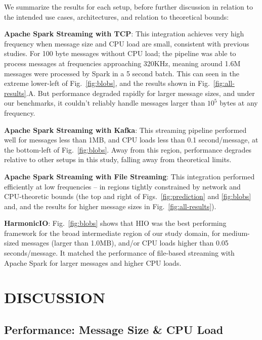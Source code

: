 \documentclass[conference]{IEEEtran}
\begin{document}
We summarize the results for each setup, before further discussion in relation to the intended use cases, architectures, and relation to theoretical bounds:%

\textbf{Apache Spark Streaming with TCP}: 
This integration achieves very high frequency when message size and CPU load are small, consistent with previous studies. For 100 byte messages without CPU load; the pipeline was able to process messages at frequencies approaching 320KHz, meaning around 1.6M messages were processed by Spark in a 5 second batch. This can seen in the extreme lower-left of Fig.~\ref{fig:blobs}, and the results shown in Fig.~\ref{fig:all-results}.A. 
But performance degraded rapidly for larger message sizes, and under our benchmarks, it couldn't reliably handle messages larger than $10^5$ bytes at any frequency.

\textbf{Apache Spark Streaming with Kafka}:
This streaming pipeline performed well for messages less than 1MB, and CPU loads  less than 0.1 second/message, at the bottom-left of Fig.~\ref{fig:blobs}. Away from this region, performance degrades relative to other setups in this study, falling away from theoretical limits.

\textbf{Apache Spark Streaming with File Streaming}: 
This integration performed efficiently at low frequencies -- in regions tightly constrained by network and CPU-theoretic bounds (the top and right of Figs.~\ref{fig:prediction} and \ref{fig:blobs} and, and the results for higher message sizes in Fig.~\ref{fig:all-results}).

\textbf{HarmonicIO}:
Fig.~\ref{fig:blobs} shows that HIO was the best performing framework for the broad intermediate region of our study domain, 
for medium-sized messages (larger than 1.0MB), and/or CPU loads higher than 0.05 seconds/message. It matched the performance of file-based streaming with Apache Spark for larger messages and higher CPU loads.%

\section{DISCUSSION}\label{discussion}

\subsection{Performance: Message Size \& CPU Load}
\end{document}
